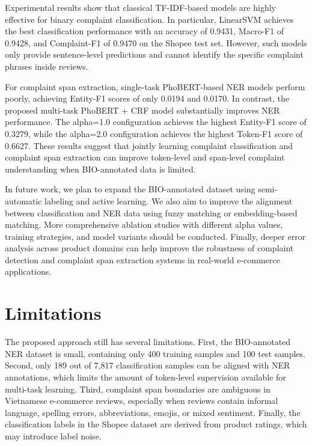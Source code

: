 \documentclass[11pt]{article}
\begin{document}
Experimental results show that classical TF-IDF-based models are highly effective for binary complaint classification. In particular, LinearSVM achieves the best classification performance with an accuracy of 0.9431, Macro-F1 of 0.9428, and Complaint-F1 of 0.9470 on the Shopee test set. However, such models only provide sentence-level predictions and cannot identify the specific complaint phrases inside reviews.

For complaint span extraction, single-task PhoBERT-based NER models perform poorly, achieving Entity-F1 scores of only 0.0194 and 0.0170. In contrast, the proposed multi-task PhoBERT + CRF model substantially improves NER performance. The alpha=1.0 configuration achieves the highest Entity-F1 score of 0.3279, while the alpha=2.0 configuration achieves the highest Token-F1 score of 0.6627. These results suggest that jointly learning complaint classification and complaint span extraction can improve token-level and span-level complaint understanding when BIO-annotated data is limited.

In future work, we plan to expand the BIO-annotated dataset using semi-automatic labeling and active learning. We also aim to improve the alignment between classification and NER data using fuzzy matching or embedding-based matching. More comprehensive ablation studies with different alpha values, training strategies, and model variants should be conducted. Finally, deeper error analysis across product domains can help improve the robustness of complaint detection and complaint span extraction systems in real-world e-commerce applications.

\section*{Limitations}

The proposed approach still has several limitations. First, the BIO-annotated NER dataset is small, containing only 400 training samples and 100 test samples. Second, only 189 out of 7,817 classification samples can be aligned with NER annotations, which limits the amount of token-level supervision available for multi-task learning. Third, complaint span boundaries are ambiguous in Vietnamese e-commerce reviews, especially when reviews contain informal language, spelling errors, abbreviations, emojis, or mixed sentiment. Finally, the classification labels in the Shopee dataset are derived from product ratings, which may introduce label noise.


\end{document}
